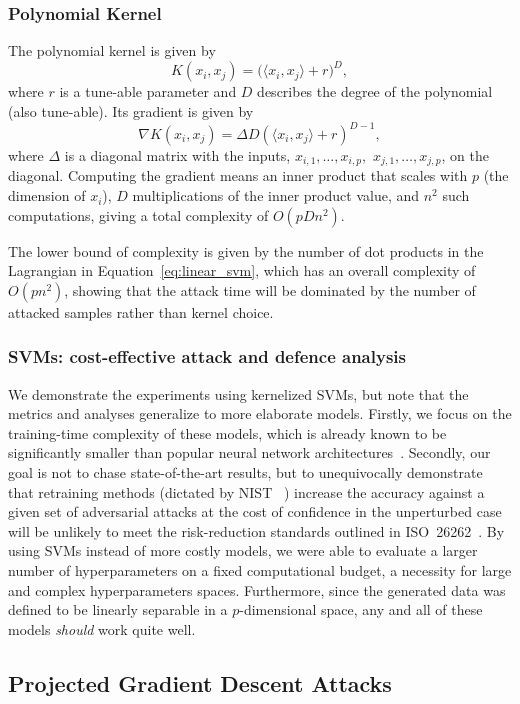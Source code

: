 \documentclass[fonts]{icst}
\begin{document}
\subsubsection{Polynomial Kernel}

The polynomial kernel is given by
$$
    K(x_i, x_j) = \big(\langle x_i, x_j \rangle + r \big)^D,
$$
where $r$ is a tune-able parameter and $D$ describes the degree of the polynomial (also tune-able).
Its gradient is given by
$$
    \nabla K(x_i, x_j) = \Delta D(\langle x_i, x_j \rangle + r)^{D-1},
$$
where $\Delta$ is a diagonal matrix with the inputs, $x_{i,1},\ldots,x_{i,p},$ $x_{j,1},\ldots,x_{j,p}$, on the diagonal.
Computing the gradient means an inner product that scales with $p$ (the dimension of $x_i$), $D$ multiplications of the inner product value, and $n^2$ such computations, giving a total complexity of $O(pDn^2)$.

The lower bound of complexity is given by the number of dot products in the Lagrangian in Equation~\ref{eq:linear_svm}, which has an overall complexity of $O(pn^2)$, showing that the attack time will be dominated by the number of attacked samples rather than kernel choice.


\subsubsection{SVMs: cost-effective attack and defence analysis}
\label{model}

We demonstrate the experiments using kernelized SVMs, but note that the metrics and analyses generalize to more elaborate models.
Firstly, we focus on the training-time complexity of these models, which is already known to be significantly smaller than popular neural network architectures~\cite{bienstock2018principled}.
Secondly, our goal is not to chase state-of-the-art results, but to unequivocally demonstrate that retraining methods (dictated by NIST ~\cite{falco2006using}) increase the accuracy against a given set of adversarial attacks at the cost of confidence in the unperturbed case will be unlikely to meet the risk-reduction standards outlined in ISO~26262~\cite{iso26262}.
By using SVMs instead of more costly models, we were able to evaluate a larger number of hyperparameters on a fixed computational budget, a necessity for large and complex hyperparameters spaces.
Furthermore, since the generated data was defined to be linearly separable in a $p$-dimensional space, any and all of these models \textit{should} work quite well.

\subsection{Projected Gradient Descent Attacks}
\end{document}

